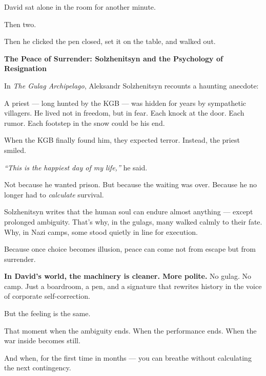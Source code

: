 David sat alone in the room for another minute.

Then two.

Then he clicked the pen closed, set it on the table, and walked out.

\begin{HistoricalSidebar}{\textbf{The Peace of Surrender: Solzhenitsyn and the Psychology of Resignation}}

    In \textit{The Gulag Archipelago}, Aleksandr Solzhenitsyn recounts a haunting anecdote:  

    \medskip
    
    A priest — long hunted by the KGB — was hidden for years by sympathetic villagers. He lived 
    not in freedom, but in fear.  
    Each knock at the door. Each rumor. Each footstep in the snow could be his end.  

    \medskip
    
    When the KGB finally found him, they expected terror.  
    Instead, the priest smiled.

    \medskip
    
    \textit{“This is the happiest day of my life,”} he said.

    \medskip
    
    Not because he wanted prison.  
    But because the waiting was over.  
    Because he no longer had to \textit{calculate} survival.  

    \medskip
    
    Solzhenitsyn writes that the human soul can endure almost anything — except prolonged ambiguity.  
    That’s why, in the gulags, many walked calmly to their fate.  
    Why, in Nazi camps, some stood quietly in line for execution.

    \medskip
    
    Because once choice becomes illusion, peace can come not from escape but from surrender.
    
    \medskip
    
    \textbf{In David’s world, the machinery is cleaner. More polite.}  
    No gulag. No camp.  
    Just a boardroom, a pen, and a signature that rewrites history in the voice of corporate 
    self-correction.

    \medskip
    
    But the feeling is the same.

    \medskip
    
    That moment when the ambiguity ends.  
    When the performance ends.  
    When the war inside becomes still.

    \medskip
    
    And when, for the first time in months —  
    you can breathe without calculating the next contingency.
    
\end{HistoricalSidebar}
    